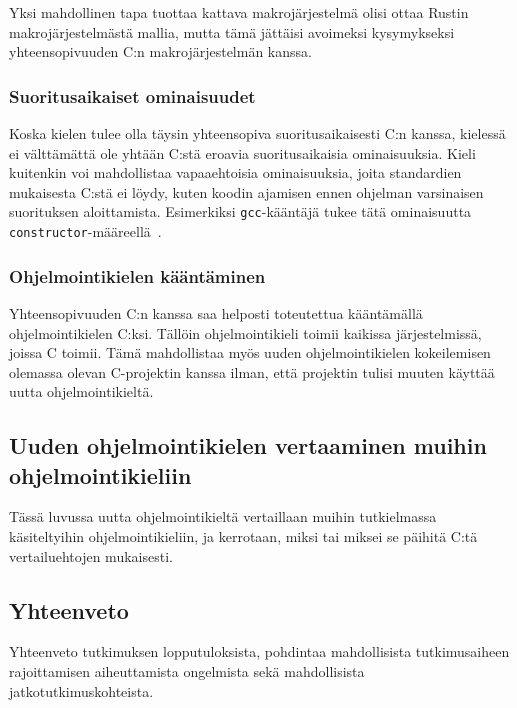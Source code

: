 Yksi mahdollinen tapa tuottaa kattava makrojärjestelmä olisi ottaa Rustin
makrojärjestelmästä mallia, mutta tämä jättäisi avoimeksi kysymykseksi
yhteensopivuuden C:n makrojärjestelmän kanssa.

\subsubsection{Suoritusaikaiset ominaisuudet}

Koska kielen tulee olla täysin yhteensopiva suoritusaikaisesti C:n kanssa,
kielessä ei välttämättä ole yhtään C:stä eroavia suoritusaikaisia
ominaisuuksia. Kieli kuitenkin voi mahdollistaa vapaaehtoisia ominaisuuksia,
joita standardien mukaisesta C:stä ei löydy, kuten koodin ajamisen ennen
ohjelman varsinaisen suorituksen aloittamista. Esimerkiksi
\texttt{gcc}-kääntäjä tukee tätä ominaisuutta
\texttt{constructor}-määreellä~\citep{gccattributes}.

\subsubsection{Ohjelmointikielen kääntäminen}

Yhteensopivuuden C:n kanssa saa helposti toteutettua kääntämällä
ohjelmointikielen C:ksi. Tällöin ohjelmointikieli toimii kaikissa
järjestelmissä, joissa C toimii. Tämä mahdollistaa myös uuden ohjelmointikielen
kokeilemisen olemassa olevan C-projektin kanssa ilman, että projektin tulisi
muuten käyttää uutta ohjelmointikieltä.

\subsection[Uuden ohjelmointikielen vertaaminen muihin ohjelmointikieliin]
{Uuden ohjelmointikielen vertaaminen muihin \\ ohjelmointikieliin}

Tässä luvussa uutta ohjelmointikieltä vertaillaan muihin tutkielmassa
käsiteltyihin ohjelmointikieliin, ja kerrotaan, miksi tai miksei se päihitä
C:tä vertailuehtojen mukaisesti.

\subsection{Yhteenveto}

Yhteenveto tutkimuksen lopputuloksista, pohdintaa mahdollisista tutkimusaiheen
rajoittamisen aiheuttamista ongelmista sekä mahdollisista
jatkotutkimuskohteista.

